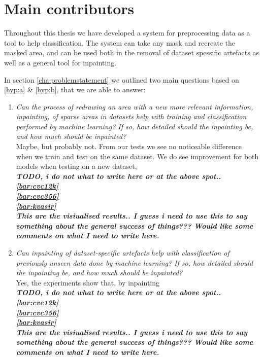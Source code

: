 \section{Main contributors}
Throughout this thesis we have developed a system for preprocessing data as a tool to help classification. 
The system can take any mask and recreate the masked area, and can be used both in the removal of dataset spessific artefacts as well as a general tool for inpainting. 

In section \ref{cha:problemstatement} we outlined two main questions based on \ref{hyp:a} \& \ref{hyp:b}, that we are able to answer:
\begin{enumerate}


\item \textit{Can the process of redrawing an area with a new more relevant information, inpainting, of sparse areas in datasets help with training and classification performed by machine learning? If so, how detailed should the inpainting be, and how much should be inpainted?}\\

Maybe, but probably not. From our tests we see no noticeable difference when we train and test on the same dataset. We do see improvement for both models when testing on a new dataset, \\
\textbf{\textit{TODO, i do not what to write here or at the above spot.. \\
\ref{bar:cvc12k}\\
\ref{bar:cvc356}\\
\ref{bar:kvasir}\\
This are the visiualised results.. I guess i need to use this to say something about the general success of things???
Would like some comments on what I need to write here.
}}


\item \textit{Can inpainting of dataset-specific artefacts help with classification of previously unseen data done by machine learning? If so, how detailed should the inpainting be, and how much should be inpainted?}\\

Yes, the experiments show that, by inpainting \\
\textbf{\textit{TODO, i do not what to write here or at the above spot.. \\
\ref{bar:cvc12k}\\
\ref{bar:cvc356}\\
\ref{bar:kvasir}\\
This are the visiualised results.. I guess i need to use this to say something about the general success of things???
Would like some comments on what I need to write here.
}}


\end{enumerate}


